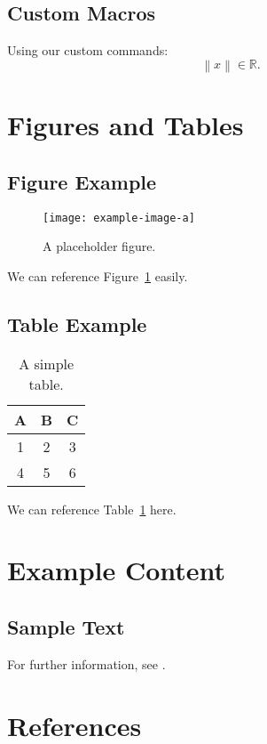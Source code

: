 \documentclass[12pt]{article}
\newcommand{\R}{\mathbb{R}}
\newcommand{\norm}[1]{\left\lVert #1 \right\rVert}
\begin{document}
\subsection{Custom Macros}
Using our custom commands:
\[
   \norm{x} \in \R.
\]

\section{Figures and Tables}

\subsection{Figure Example}
\begin{figure}[ht]
    \centering
    \texttt{[image: example-image-a]}
    \caption{A placeholder figure.}
    \label{fig:placeholder}
\end{figure}
We can reference Figure~\ref{fig:placeholder} easily.

\subsection{Table Example}
\begin{table}[ht]
    \centering
    \begin{tabular}{c c c}
    \toprule
    A & B & C \\
    \midrule
    1 & 2 & 3 \\
    4 & 5 & 6 \\
    \bottomrule
    \end{tabular}
    \caption{A simple table.}
    \label{tab:mytable}
\end{table}
We can reference Table~\ref{tab:mytable} here.

\section{Example Content}
\subsection{Sample Text}
\lipsum[1]  %
For further information, see \cite{einstein1905}.

\section{References}
\printbibliography
\end{document}
